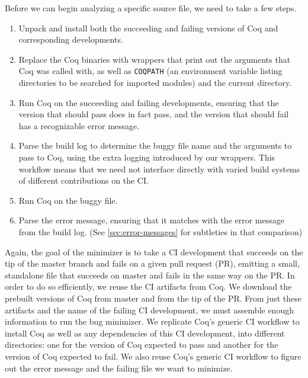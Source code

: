 \documentclass[a4paper,USenglish,cleveref,autoref,thm-restate]{lipics-v2021}
\begin{document}
Before we can begin analyzing a specific source file, we need to take a few steps.
\begin{enumerate}
\item Unpack and install both the succeeding and failing versions of Coq and corresponding developments.
\item Replace the Coq binaries with wrappers that print out the arguments that Coq was called with, as well as \texttt{COQPATH} (an environment variable listing directories to be searched for imported modules) and the current directory.
\item Run Coq on the succeeding and failing developments, ensuring that the version that should pass does in fact pass, and the version that should fail has a recognizable error message.
\item Parse the build log to determine the buggy file name and the arguments to pass to Coq, using the extra logging introduced by our wrappers.
  This workflow means that we need not interface directly with varied build systems of different contributions on the CI.
\item Run Coq on the buggy file.
\item Parse the error message, ensuring that it matches with the error message from the build log.
  (See \autoref{sec:error-messages} for subtleties in that comparison)
\end{enumerate}

Again, the goal of the minimizer is to take a CI development that succeeds on the tip of the master branch and fails on a given pull request (PR), emitting a small, standalone file that succeeds on master and fails in the same way on the PR.
In order to do so efficiently, we reuse the CI artifacts from Coq.
We download the prebuilt versions of Coq from master and from the tip of the PR.
From just these artifacts and the name of the failing CI development, we must assemble enough information to run the bug minimizer.
We replicate Coq's generic CI workflow to install Coq as well as any dependencies of this CI development, into different directories: one for the version of Coq expected to pass and another for the version of Coq expected to fail.
We also reuse Coq's generic CI workflow to figure out the error message and the failing file we want to minimize.
\end{document}
